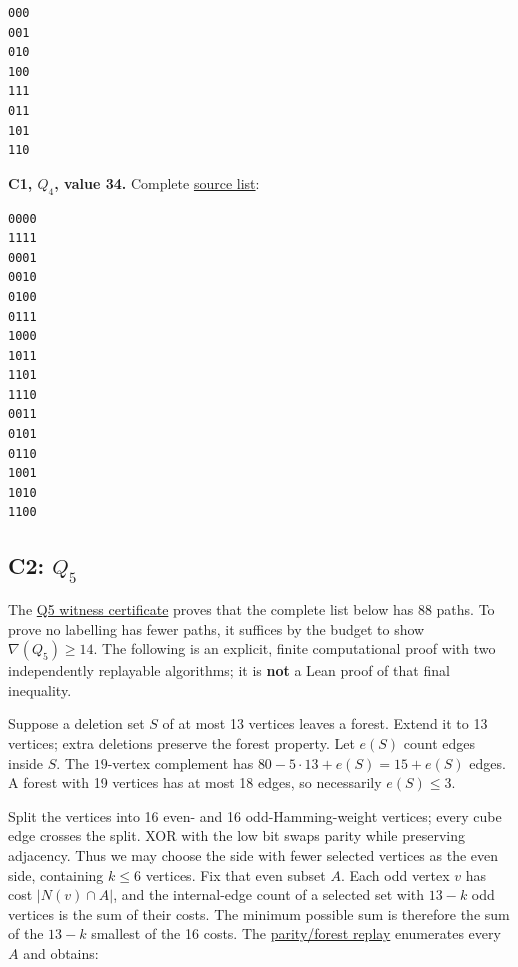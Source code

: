 \documentclass[11pt,a4paper]{article}
\begin{document}
\begin{Verbatim}[breaklines,breakanywhere,fontsize=\footnotesize]
000
001
010
100
111
011
101
110
\end{Verbatim}

\textbf{C1, \(Q_4\), value 34.} Complete \href{https://github.com/mpelteshki/climbing-to-the-frontier/blob/0680fde5d583d78c8a871bcf2bfae1028e16f117/cagent/p2/c1/q4-labels.txt}{source list}:

\begin{Verbatim}[breaklines,breakanywhere,fontsize=\footnotesize]
0000
1111
0001
0010
0100
0111
1000
1011
1101
1110
0011
0101
0110
1001
1010
1100
\end{Verbatim}

\subsection{\texorpdfstring{C2: \(Q_5\)}{C2: Q\_5}}\label{c2-q_5}

The \href{https://github.com/mpelteshki/climbing-to-the-frontier/blob/0680fde5d583d78c8a871bcf2bfae1028e16f117/cagent/p2/c2/Q5.lean}{Q5 witness certificate} proves that the complete list below has 88 paths. To prove no labelling has fewer paths, it suffices by the budget to show \(\nabla(Q_5)\ge14\). The following is an explicit, finite computational proof with two independently replayable algorithms; it is \textbf{not} a Lean proof of that final inequality.

Suppose a deletion set \(S\) of at most 13 vertices leaves a forest. Extend it to 13 vertices; extra deletions preserve the forest property. Let \(e(S)\) count edges inside \(S\). The \(19\)-vertex complement has \(80-5\cdot13+e(S)=15+e(S)\) edges. A forest with 19 vertices has at most 18 edges, so necessarily \(e(S)\le3\).

Split the vertices into 16 even- and 16 odd-Hamming-weight vertices; every cube edge crosses the split. XOR with the low bit swaps parity while preserving adjacency. Thus we may choose the side with fewer selected vertices as the even side, containing \(k\le6\) vertices. Fix that even subset \(A\). Each odd vertex \(v\) has cost \(|N(v)\cap A|\), and the internal-edge count of a selected set with \(13-k\) odd vertices is the sum of their costs. The minimum possible sum is therefore the sum of the \(13-k\) smallest of the 16 costs. The \href{https://github.com/mpelteshki/climbing-to-the-frontier/blob/0680fde5d583d78c8a871bcf2bfae1028e16f117/cagent/p2/c2/decycling5_parity_replay.py}{parity/forest replay} enumerates every \(A\) and obtains:
\end{document}
